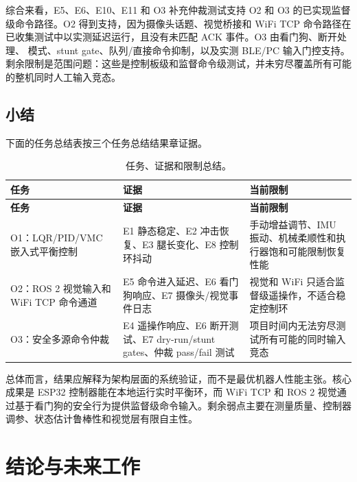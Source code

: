 \documentclass[12pt, a4paper]{article}
\begin{document}
综合来看，E5、E6、E10、E11 和 O3 补充仲裁测试支持 O2 和 O3 的已实现监督级命令路径。O2 得到支持，因为摄像头话题、视觉桥接和 WiFi TCP 命令路径在已收集测试中以实测延迟运行，且没有未匹配 ACK 事件。O3 由看门狗、断开处理、\texttt{} 模式、stunt gate、队列/直接命令抑制，以及实测 BLE/PC 输入门控支持。剩余限制是范围问题：这些是控制板级和监督命令级测试，并未穷尽覆盖所有可能的整机同时人工输入竞态。

\subsection{小结}

下面的任务总结表按三个任务总结结果章证据。

\begingroup
\singlespacing
\small
\setlength{\tabcolsep}{2pt}
\renewcommand{\arraystretch}{1.15}
\begin{longtable}{>{\RaggedRight\arraybackslash}p{}>{\RaggedRight\arraybackslash}p{}>{\RaggedRight\arraybackslash}p{}}
\caption{任务、证据和限制总结。}\\
\toprule
\textbf{任务} & \textbf{证据} & \textbf{当前限制} \\
\midrule
\endfirsthead
\toprule
\textbf{任务} & \textbf{证据} & \textbf{当前限制} \\
\midrule
\endhead
O1：LQR/PID/VMC 嵌入式平衡控制 & E1 静态稳定、E2 冲击恢复、E3 腿长变化、E8 控制环抖动 & 手动增益调节、IMU 振动、机械柔顺性和执行器饱和可能限制恢复性能 \\
O2：ROS 2 视觉输入和 WiFi TCP 命令通道 & E5 命令进入延迟、E6 看门狗响应、E7 摄像头/视觉事件日志 & 视觉和 WiFi 只适合监督级遥操作，不适合稳定控制环 \\
O3：安全多源命令仲裁 & E4 遥操作响应、E6 断开测试、E7 dry-run/stunt gates、仲裁 pass/fail 测试 & 项目时间内无法穷尽测试所有可能的同时输入竞态 \\
\bottomrule
\end{longtable}
\endgroup

总体而言，结果应解释为架构层面的系统验证，而不是最优机器人性能主张。核心成果是 ESP32 控制器能在本地运行实时平衡环，而 WiFi TCP 和 ROS 2 视觉通过基于看门狗的安全行为提供监督级命令输入。剩余弱点主要在测量质量、控制器调参、状态估计鲁棒性和视觉层有限自主性。



\section{结论与未来工作}
\end{document}
